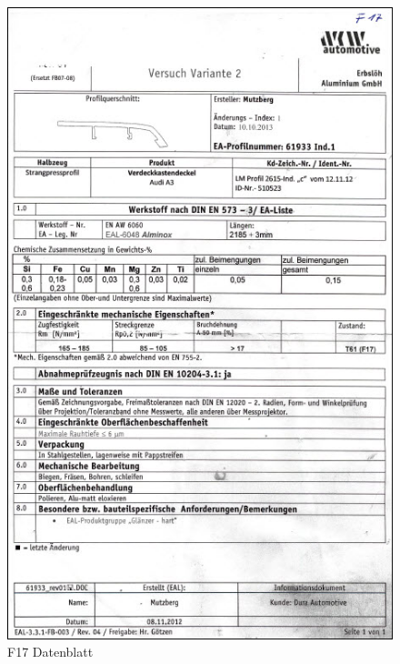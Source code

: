 \documentclass[12pt,a4paper,parskip]{scrartcl}
\begin{document}
\begin{figure}[hbtp]
\centering
\includegraphics[width=1\textwidth]{F17Datenblatt.jpg}
\caption{F17 Datenblatt}
\end{figure}
\end{document}
